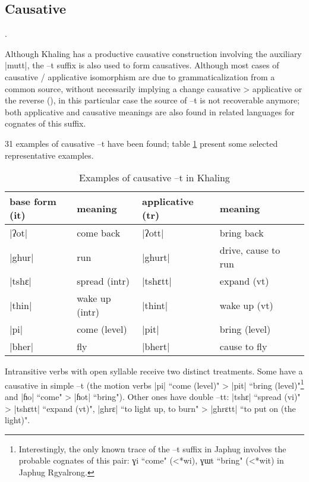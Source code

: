 \documentclass[oldfontcommands,oneside,a4paper,11pt]{article}
\newcommand{\ipa}[1]{{\phon #1}} %
\newcommand{\dhatu}[1]{|\ipa{#1}|}
\begin{document}
\subsection{Causative}.


Although Khaling has a productive causative construction involving the auxiliary \dhatu{mutt}, the \ipa{--t} suffix is also used to form causatives. Although most cases of causative / applicative isomorphism are due to grammaticalization from a common source, without necessarily implying a change causative > applicative or the reverse (\citealt[64]{peterson07appl}), in this particular case the source of \ipa{--t} is not recoverable anymore; both applicative and causative meanings are also found in related languages for cognates of this suffix.

31 examples of causative \ipa{--t} have been found; table \ref{tab:caus} present some selected representative examples.

\begin{table}[H]
\caption{Examples of causative \ipa{--t} in Khaling} \label{tab:caus}
\begin{tabular}{lllll}
\toprule
base form (it) & meaning & applicative (tr) & meaning \\
\midrule
\dhatu{ʔot} & come back & \dhatu{ʔott} &bring back\\
\dhatu{ghur} & run & \dhatu{ghurt} &drive, cause to run\\
\dhatu{tshɛ} & spread (intr) & \dhatu{tshɛtt} & expand (vt)\\
\dhatu{thin} & wake up (intr) & \dhatu{thint} &wake up (vt)\\
\dhatu{pi} & come (level) & \dhatu{pit} &bring (level)\\
\dhatu{bher} & fly & \dhatu{bhert} &cause to fly\\
\bottomrule
\end{tabular}
\end{table}
Intransitive verbs with open syllable receive two distinct treatments. Some have a causative in simple \ipa{--t} (the motion verbs \dhatu{pi} ``come (level)" > \dhatu{pit} ``bring (level)"\footnote{Interestingly, the only known trace of the \ipa{--t} suffix in Japhug involves the probable cognates of this pair: \ipa{ɣi} ``come" (<*wi), \ipa{ɣɯt} ``bring" (<*wit) in Japhug Rgyalrong.} and \dhatu{ɦo} ``come" > \dhatu{ɦot} ``bring"). Other ones have double \ipa{--tt}: \dhatu{tshɛ} ``spread (vi)" > \dhatu{tshɛtt} ``expand (vt)", \dhatu{ghrɛ} ``to light up, to burn" > \dhatu{ghrɛtt} ``to put on (the light)".
\end{document}
